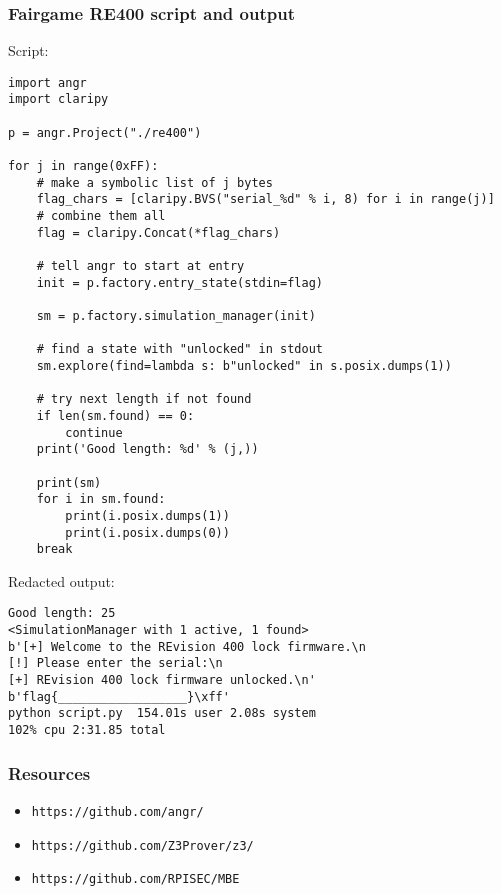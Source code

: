 \documentclass[aspectratio=169]{beamer}
\begin{document}
\begin{frame}[fragile]
\frametitle{Fairgame RE400 script and output}
\begin{minipage}{0.55\textwidth}
Script:
\begin{Verbatim}[frame=single, fontsize=\tiny]
import angr
import claripy

p = angr.Project("./re400")

for j in range(0xFF):
    # make a symbolic list of j bytes
    flag_chars = [claripy.BVS("serial_%d" % i, 8) for i in range(j)]
    # combine them all
    flag = claripy.Concat(*flag_chars)

    # tell angr to start at entry
    init = p.factory.entry_state(stdin=flag)

    sm = p.factory.simulation_manager(init)

    # find a state with "unlocked" in stdout
    sm.explore(find=lambda s: b"unlocked" in s.posix.dumps(1))

    # try next length if not found
    if len(sm.found) == 0:
        continue
    print('Good length: %d' % (j,))

    print(sm)
    for i in sm.found:
        print(i.posix.dumps(1))
        print(i.posix.dumps(0))
    break
\end{Verbatim}
\end{minipage}
\begin{minipage}{0.44\textwidth}
Redacted output:
\begin{Verbatim}[frame=single, fontsize=\tiny]
Good length: 25
<SimulationManager with 1 active, 1 found>
b'[+] Welcome to the REvision 400 lock firmware.\n
[!] Please enter the serial:\n
[+] REvision 400 lock firmware unlocked.\n'
b'flag{__________________}\xff'
python script.py  154.01s user 2.08s system
102% cpu 2:31.85 total
\end{Verbatim}
\end{minipage}
\end{frame}


\begin{frame}[fragile]
\frametitle{Resources}
\begin{itemize}
\item \verb|https://github.com/angr/|
\item \verb|https://github.com/Z3Prover/z3/|
\item \verb|https://github.com/RPISEC/MBE|
\end{itemize}
\end{frame}
\end{document}
